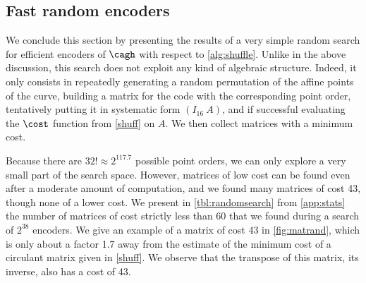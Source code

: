 \subsection{Fast random encoders}

We conclude this section by presenting the results of a very simple random search for efficient encoders of $\cagh$ with respect to \autoref{alg:shuffle}. Unlike
in the above discussion, this search does not exploit any kind of algebraic structure.
Indeed, it only consists in repeatedly generating a random permutation of the affine points of the curve, building
a matrix for the code with the corresponding point order, tentatively putting it in systematic form $(I_{16}~A)$, and if successful evaluating
the $\cost$ function from \autoref{shuff} on $A$. We then collect matrices with a minimum cost.

Because there are $32! \approx 2^{117.7}$ possible point orders, we can only explore a very small part of the search space. However,
matrices of low cost can be found even after a moderate amount of computation, and we found many matrices of
cost 43, though none of a lower cost. We present in \autoref{tbl:randomsearch} from \autoref{app:stats} the number of matrices of cost strictly less than 60
that we found during a search of $2^{38}$ encoders.
We give an example of a matrix of cost 43 in \autoref{fig:matrand}, which is only about a factor 1.7 away from the estimate of the minimum cost of a circulant matrix
given in \autoref{shuff}. We observe that the transpose of this matrix, \ie its inverse, also has a cost of 43.
